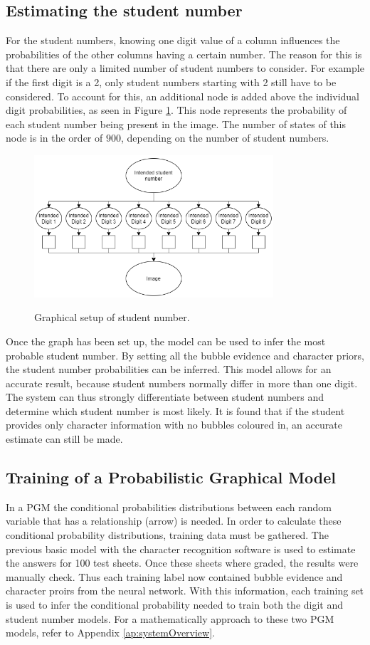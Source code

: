\subsection{Estimating the student number}
\label{sec:studentNumber}

For the student numbers, knowing one digit value of a column influences the probabilities of the other columns having a certain number. The reason for this is that there are only a limited number of student numbers to consider. For example if the first digit is a 2, only student numbers starting with 2 still have to be considered. To account for this, an additional node is added above the individual digit probabilities, as seen in Figure \ref{fig:stdNumCh4}. This node represents the probability of each student number being present in the image. The number of states of this node is in the order of $ 900$, depending on the number of student numbers.
\begin{figure}[b]
  \centering
  \includegraphics[width=8.9cm]{stdNum}\\
  \caption{Graphical setup of student number.}
  \label{fig:stdNumCh4}
\end{figure}
Once the graph has been set up, the model can be used to infer the most probable student number. By setting all the bubble evidence and character priors, the student number probabilities can be inferred. This model allows for an accurate result, because student numbers normally differ in more than one digit. The system can thus strongly differentiate between student numbers and determine which student number is most likely. It is found that if the student provides only character information with no bubbles coloured in, an accurate estimate can still be made.

\subsection{Training of a Probabilistic Graphical Model}
In a PGM the conditional probabilities distributions between each random variable that has a relationship (arrow) is needed. In order to calculate these conditional probability distributions, training data must be gathered. The previous basic model with the character recognition software is used to estimate the answers for 100 test sheets. Once these sheets where graded, the results were manually check. Thus each training label now contained bubble evidence and character proirs from the neural network. With this information, each training set is used to infer the conditional probability needed to train both the digit and student number models. For a mathematically approach to these two PGM models, refer to Appendix \ref{ap:systemOverview}.

